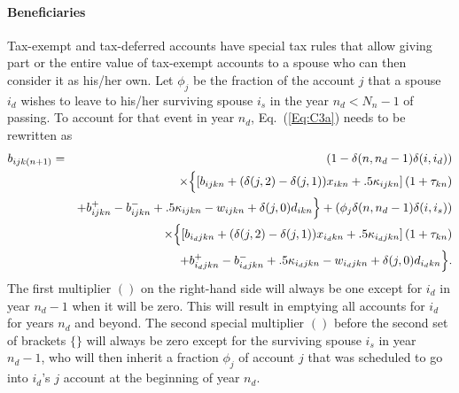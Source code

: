 \documentclass{report}[fleqn,12pt]
\begin{document}
\paragraph*{Beneficiaries}
Tax-exempt and tax-deferred accounts have special tax rules that allow giving part
or the entire value of
tax-exempt accounts to a spouse who can then consider it as his/her own.
Let $\phi_j$ be the fraction of the account $j$ that a spouse $i_d$ wishes
to leave to his/her surviving spouse $i_s$
in the year $n_d < N_n - 1$ of passing. 
To account for that event in year $n_d$, Eq.~(\ref{Eq:C3a}) needs to be rewritten as
\begin{eqnarray}
	b_{ijk(n+1)} &=& (1 - \delta(n, n_d-1)\delta(i, i_d)) \nonumber \\
	&&\times \Bigl\{\left[b_{ijkn} + (\delta(j, 2) - \delta(j, 1))x_{ikn}
	+ .5\kappa_{ijkn}\right](1 + \tau_{kn}) 
	\nonumber \\
	&& +  b^+_{ijkn} - b^-_{ijkn} + .5 \kappa_{ijkn} - w_{ijkn} + \delta(j, 0)d_{ikn} \Bigr\}
	+ (\phi_j\delta(n, n_d-1)\delta(i, i_s)) \nonumber  \\
	&& \times \Bigl\{\left[b_{i_djkn} + (\delta(j, 2) - \delta(j, 1))x_{i_dkn}
	+ .5\kappa_{i_djkn}\right](1 + \tau_{kn}) 
	\nonumber \\
	&& + b^+_{i_djkn} - b^-_{i_djkn} + .5 \kappa_{i_djkn} - w_{i_djkn} + \delta(j, 0)d_{i_dkn}\Bigr\} .
\end{eqnarray}
The first multiplier $()$ on the right-hand side will always be one except for $i_d$ in
year $n_d-1$ when it will be zero. This will result in emptying all accounts for $i_d$ for years
$n_d$ and beyond.
The second special multiplier $()$ before the second set of brackets
$\{\}$ will always be zero except for the surviving
spouse $i_s$ in year $n_d-1$, who will then inherit a fraction $\phi_j$ of account $j$ that
was scheduled to go into $i_d$'s $j$ account at the beginning of year $n_d$.
\end{document}
